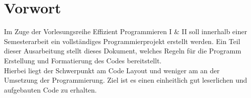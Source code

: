 \chapter{Vorwort}
Im Zuge der Vorlesungsreihe Effizient Programmieren I $\&$ II soll innerhalb einer Semesterarbeit ein vollständiges Programmierprojekt erstellt werden. Ein Teil dieser Ausarbeitung stellt dieses Dokument, welches Regeln  für die Programm Erstellung und Formatierung des Codes bereitstellt. \\
Hierbei liegt der Schwerpunkt am Code Layout und weniger am an der Umsetzung der Programmierung. Ziel ist es einen einheitlich gut leserlichen und aufgebauten Code zu erhalten.

